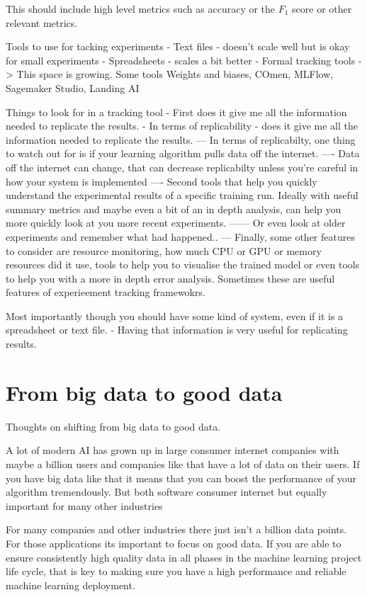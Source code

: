 This should include high level metrics such as accuracy or the $F_1$ score or other relevant metrics.

Tools to use for tacking experiments
- Text files  - doesn't scale well but is okay for small experiments
- Spreadsheets - scales a bit better
- Formal tracking tools
-> This space is growing.
Some tools Weights and biases, COmen, MLFlow, Sagemaker Studio, Landing AI

Things to look for in a tracking tool
- First does it give me all the information needed to replicate the results.
- In terms of replicability - does it give me all the information needed to replicate the results.
--- In terms of replicabilty, one thing to watch out for is if your learning algorithm pulls data off the internet.
---- Data off the internet can change, that can decrease replicabilty unless you're careful in how your system is implemented
---- Second tools that help you quickly understand the experimental results of a specific training run.
Ideally with useful summary metrics and maybe even a bit of an in depth analysis, can help you more quickly look at you more recent experiments.
------ Or even look at older experiments and remember what had happened..
--- Finally, some other features to consider are resource monitoring, how much CPU or GPU or memory resources did it use, tools to help you to visualise the trained model or even tools to help you with a more in depth error analysis.
Sometimes these are useful features of experieement tracking framewokrs.

Most importantly though you should have some kind of system, even if it is a spreadsheet or text file.
- Having that information is very useful for replicating results.

\section{From big data to good data}

Thoughts on shifting from big data to good data.

A lot of modern AI has grown up in large consumer internet companies with maybe a billion users and companies like that have a lot of data on their users.
If you have big data like that it means that you can boost the performance of your algorithm tremendously.
But both software consumer internet but equally important for many other industries

For many companies and other industries there just isn't a billion data points.
For those applications its important to focus on good data.
If you are able to ensure consistently high quality data in all phases in the machine learning project life cycle, that is key to making sure you have a high performance and reliable machine learning deployment.


